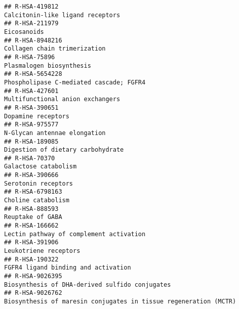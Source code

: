 \documentclass[
]{article}
\begin{document}
\begin{verbatim}
## R-HSA-419812                                                                                                      Calcitonin-like ligand receptors
## R-HSA-211979                                                                                                                           Eicosanoids
## R-HSA-8948216                                                                                                         Collagen chain trimerization
## R-HSA-75896                                                                                                               Plasmalogen biosynthesis
## R-HSA-5654228                                                                                              Phospholipase C-mediated cascade; FGFR4
## R-HSA-427601                                                                                                      Multifunctional anion exchangers
## R-HSA-390651                                                                                                                    Dopamine receptors
## R-HSA-975577                                                                                                          N-Glycan antennae elongation
## R-HSA-189085                                                                                                     Digestion of dietary carbohydrate
## R-HSA-70370                                                                                                                   Galactose catabolism
## R-HSA-390666                                                                                                                   Serotonin receptors
## R-HSA-6798163                                                                                                                   Choline catabolism
## R-HSA-888593                                                                                                                      Reuptake of GABA
## R-HSA-166662                                                                                               Lectin pathway of complement activation
## R-HSA-391906                                                                                                                 Leukotriene receptors
## R-HSA-190322                                                                                                   FGFR4 ligand binding and activation
## R-HSA-9026395                                                                                       Biosynthesis of DHA-derived sulfido conjugates
## R-HSA-9026762                                                                     Biosynthesis of maresin conjugates in tissue regeneration (MCTR)

\end{verbatim}
\end{document}
